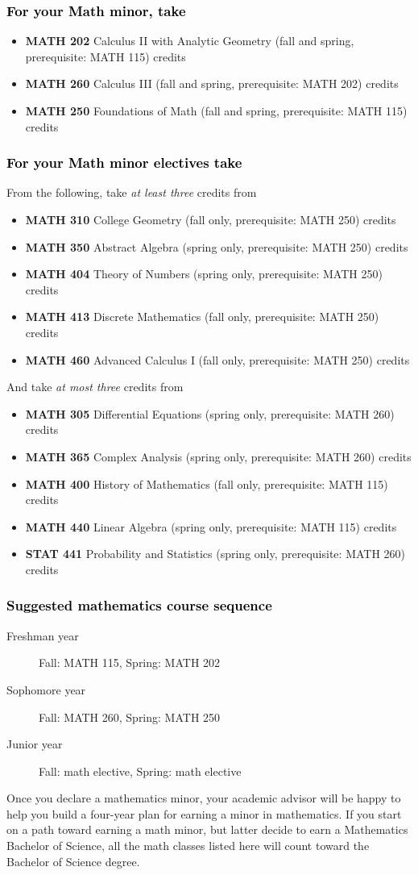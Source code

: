 \documentclass[10pt]{article}
\newcommand{\calctwo}{\textbf{MATH 202} Calculus II with Analytic Geometry (fall and spring, prerequisite: MATH 115) \dotfill 5 credits }
\newcommand{\foundations}{\textbf{MATH 250} Foundations of Math (fall and spring, prerequisite: MATH 115)  \dotfill 3 credits}
\newcommand{\calcthree}{\textbf{MATH 260} Calculus III  (fall and spring, prerequisite: MATH 202) \dotfill 5 credits}
\newcommand{\linear}{\textbf{MATH 440} Linear Algebra (spring only, prerequisite: MATH 115) \dotfill 3 credits}
\newcommand{\discrete}{\textbf{MATH 413} Discrete Mathematics  (fall only, prerequisite: MATH 250)\dotfill 3 credits}
\newcommand{\statistics}{\textbf{STAT 441} Probability and Statistics (spring only, prerequisite: MATH 260)  \dotfill  3 credits}
\newcommand{\diffeq}{\textbf{MATH 305}	Differential Equations (spring only, prerequisite: MATH 260) \dotfill 	3 credits}
\newcommand{\abstractalgebra}{\textbf{MATH 350}	Abstract Algebra (spring only, prerequisite: MATH 250) \dotfill 	3 credits}
\newcommand{\complex}{\textbf{MATH 365}	Complex Analysis (spring only,  prerequisite: MATH 260) \dotfill 3 credits}
\newcommand{\advancedcalc}{\textbf{MATH 460}	Advanced Calculus I  (fall only,   prerequisite: MATH 250) \dotfill 3 credits}
\newcommand{\collegegeometry}{\textbf{MATH 310}	College Geometry (fall only,  prerequisite: MATH 250) \dotfill 3 credits}
\newcommand{\mathhistory}{\textbf{MATH 400} History of Mathematics (fall only,  prerequisite: MATH 115) \dotfill 3 credits}
\newcommand{\numbertheory}{\textbf{MATH 404} Theory of Numbers (spring only,  prerequisite: MATH 250) \dotfill 3 credits}
\begin{document}
\subsubsection*{\textcolor{black}{For your Math minor, take}}
\begin{itemize}
  \item \calctwo
  \item \calcthree
\item \foundations
\end{itemize}

\subsubsection*{\textcolor{black}{For your Math minor electives take}}

From the following, take \emph{at least three} credits from
\vspace{0.1in}

\begin{itemize}
\item \collegegeometry
\item \abstractalgebra
\item \numbertheory
\item \discrete
\item \advancedcalc
\end{itemize}

\vspace{0.1in}
\noindent And take \emph{at most  three} credits from
\vspace{0.1in}
\begin{itemize}
\item \diffeq
\item \complex
\item \mathhistory
\item \linear
\item \statistics
\end{itemize}



\subsubsection*{\textcolor{black}{Suggested mathematics course sequence}}

\begin{description}
   \item[\phantom{xxx} Freshman year] Fall: MATH 115, Spring:  MATH 202
      \item[\phantom{xxx} Sophomore year]  Fall: MATH 260,  Spring: MATH 250
     \item[\phantom{xxx} Junior year]  Fall: math elective, Spring: math elective
 \end{description}
  \vspace{0.1in}

 \noindent Once you declare a mathematics minor, your academic advisor will be happy to help you build a four-year plan for earning a minor in mathematics.  If you start on a path toward earning a math minor, but latter decide to earn a  Mathematics Bachelor of Science, all the math classes listed here will count toward the Bachelor of Science degree.

   \vspace{0.1in}
\end{document}
